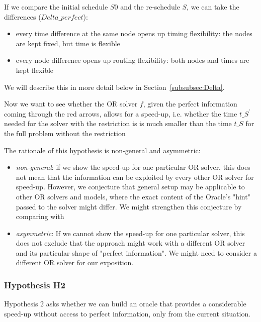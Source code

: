 \documentclass{article}
\begin{document}
If we compare the initial schedule $S0$ and the re-schedule $S$, we can take the differences ($Delta\_perfect$):

\begin{itemize}
    \item     every time difference at the same node opens up timing flexibility: the nodes are kept fixed, but time is flexible
    \item every node difference opens up routing flexibility: both nodes and times are kept flexible
\end{itemize}
We will describe this in more detail below in Section~\ref{subsubsec:Delta}.


Now we want to see whether the OR solver $f$, given the perfect information coming through the red arrows, allows for a speed-up, i.e. whether the time $t\_{S^\prime}$  needed for the solver with the restriction is is much smaller than the time $t\_S$ for the full problem without the restriction

The rationale of this hypothesis is non-general and asymmetric:
%
\begin{itemize}
    \item
    \emph{non-general}: if we show the speed-up for one particular OR solver, this does not mean that the information can be exploited by every other OR solver for speed-up. However, we conjecture that general setup may be applicable to other OR solvers and models, where the exact content of the Oracle's "hint" passed to the solver might differ. We might strengthen this conjecture by comparing with
\item
    \emph{asymmetric}: If we cannot show the speed-up for one particular solver, this does not exclude that the approach might work with a different OR solver and its particular shape of "perfect information". We might need to consider a different OR solver for our exposition.
\end{itemize}



\subsubsection{Hypothesis H2}\label{subec:H2}
Hypothesis 2 asks whether we can build an oracle that provides a considerable speed-up without access to perfect information, only from the current situation.
\end{document}
